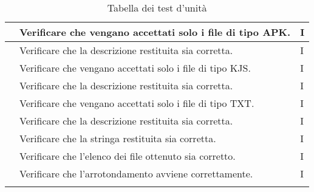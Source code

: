 \begin{center}
\begin{longtable}{ |C{3cm} | C{8.5cm}| C{1.5cm} |}
                     & Verificare che vengano accettati solo i file di tipo APK.                                               & I              \\\hline
                     & Verificare che la descrizione restituita sia corretta.                                                  & I              \\\hline
                     & Verificare che vengano accettati solo i file di tipo KJS.                                               & I              \\\hline
                     & Verificare che la descrizione restituita sia corretta.                                                  & I              \\\hline
                     & Verificare che vengano accettati solo i file di tipo TXT.                                               & I              \\\hline
                     & Verificare che la descrizione restituita sia corretta.                                                  & I              \\\hline
                     & Verificare che la stringa restituita sia corretta.                                                      & I              \\\hline
                     & Verificare che l'elenco dei file ottenuto sia corretto.                                                 & I              \\\hline
                     & Verificare che l'arrotondamento avviene correttamente.                                                  & I              \\\hline
        \caption{Tabella dei test d'unità}
    \end{longtable}
\end{center}
\setcounter{rowcount}{0}

